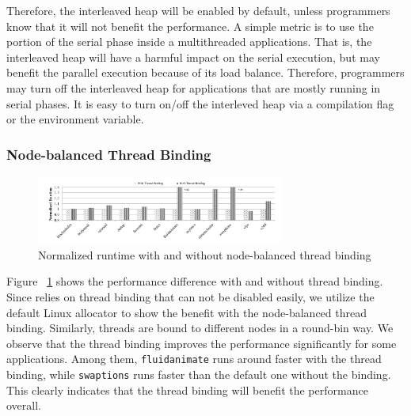 Therefore, the interleaved heap will be enabled by default, unless programmers know that it will not benefit the performance. A simple metric is to use the portion of the serial phase inside a multithreaded applications.  That is, the interleaved heap will have a harmful impact on the serial execution, but may benefit the parallel execution because of its load balance. Therefore, programmers may turn off the interleaved heap for applications that are mostly running in serial phases. It is easy to turn on/off the interleved heap via a compilation flag or the environment variable.  





\subsubsection{Node-balanced Thread Binding}
\label{sec: threadbinding}

\begin{figure}[!h]
    \centering
    \includegraphics[width=3.2in]{figure/WO-pthread-binding-new.pdf}
    \caption{Normalized runtime with and without node-balanced thread binding}
    \label{binding-pthread-scalibity}
\end{figure}

Figure ~\ref{binding-pthread-scalibity} shows the performance difference with and without thread binding. Since \NM{} relies on thread binding that can not be disabled easily, we utilize the default Linux allocator to show the benefit with the node-balanced thread binding. Similarly, threads are bound to different nodes in a round-bin way. We observe that the thread binding improves the performance significantly for some applications. Among them, \texttt{fluidanimate} runs around \toconfirm{$1.55\times$} faster with the thread binding, while \texttt{swaptions} runs  faster than the default one without the binding. This clearly indicates that the thread binding will benefit the performance overall. 


